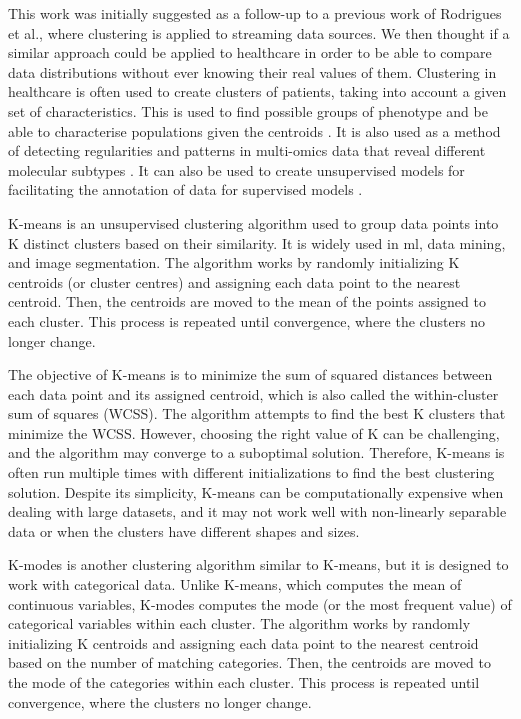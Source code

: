 This work was initially suggested as a follow-up to a previous work of Rodrigues et al., \cite{rodriguesLocalAlgorithmApproximate2018a} where clustering is applied to streaming data sources. We then thought if a similar approach could be applied to healthcare in order to be able to compare data distributions without ever knowing their real values of them.
Clustering in healthcare is often used to create clusters of patients, taking into account a given set of characteristics. This is used to find possible groups of phenotype and be able to characterise populations given the centroids \cite{walkerUnsupervisedLearningTechniques2019,basileInformaticsMachineLearning2018}. It is also used as a method of detecting regularities and patterns in multi-omics data that reveal different molecular subtypes \cite{nicoraIntegratedMultiOmicsAnalyses2020,rappoportMultiomicMultiviewClustering2018}. It can also be used to create unsupervised models for facilitating the annotation of data for supervised models \cite{mcalpineUtilityUnsupervisedMachine2022}. 

K-means \cite{lloydLeastSquaresQuantization1982,steinley2007initializing,macqueen1967classification} is an unsupervised clustering algorithm used to group data points into K distinct clusters based on their similarity. It is widely used in \ac{ml}, data mining, and image segmentation. The algorithm works by randomly initializing K centroids (or cluster centres) and assigning each data point to the nearest centroid. Then, the centroids are moved to the mean of the points assigned to each cluster. This process is repeated until convergence, where the clusters no longer change.

The objective of K-means is to minimize the sum of squared distances between each data point and its assigned centroid, which is also called the within-cluster sum of squares (WCSS). The algorithm attempts to find the best K clusters that minimize the WCSS. However, choosing the right value of K can be challenging, and the algorithm may converge to a suboptimal solution. Therefore, K-means is often run multiple times with different initializations to find the best clustering solution. Despite its simplicity, K-means can be computationally expensive when dealing with large datasets, and it may not work well with non-linearly separable data or when the clusters have different shapes and sizes.

K-modes is another clustering algorithm similar to K-means, but it is designed to work with categorical data. Unlike K-means, which computes the mean of continuous variables, K-modes computes the mode (or the most frequent value) of categorical variables within each cluster. The algorithm works by randomly initializing K centroids and assigning each data point to the nearest centroid based on the number of matching categories. Then, the centroids are moved to the mode of the categories within each cluster. This process is repeated until convergence, where the clusters no longer change.

